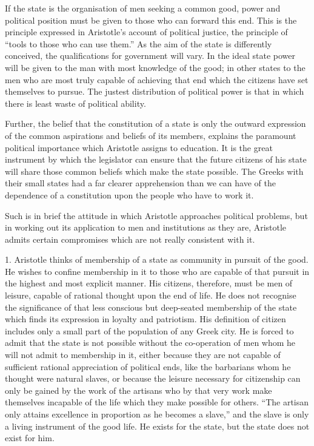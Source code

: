 If the state is the organisation of men seeking a common good, power and
political position must be given to those who can forward this end. This
is the principle expressed in Aristotle's account of political justice,
the principle of ``tools to those who can use them.'' As the aim of the
state is differently conceived, the qualifications for government will
vary. In the ideal state power will be given to the man with most
knowledge of the good; in other states to the men who are most truly
capable of achieving that end which the citizens have set themselves to
pursue. The justest distribution of political power is that in which there
is least waste of political ability.

Further, the belief that the constitution of a state is only the outward
expression of the common aspirations and beliefs of its members, explains
the paramount political importance which Aristotle assigns to education.
It is the great instrument by which the legislator can ensure that the
future citizens of his state will share those common beliefs which make
the state possible. The Greeks with their small states had a far clearer
apprehension than we can have of the dependence of a constitution upon the
people who have to work it.

Such is in brief the attitude in which Aristotle approaches political
problems, but in working out its application to men and institutions as
they are, Aristotle admits certain compromises which are not really
consistent with it.

1. Aristotle thinks of membership of a state as community in pursuit of
the good. He wishes to confine membership in it to those who are capable
of that pursuit in the highest and most explicit manner. His citizens,
therefore, must be men of leisure, capable of rational thought upon the
end of life. He does not recognise the significance of that less conscious
but deep-seated membership of the state which finds its expression in
loyalty and patriotism. His definition of citizen includes only a small
part of the population of any Greek city. He is forced to admit that the
state is not possible without the co-operation of men whom he will not
admit to membership in it, either because they are not capable of
sufficient rational appreciation of political ends, like the barbarians
whom he thought were natural slaves, or because the leisure necessary for
citizenship can only be gained by the work of the artisans who by that
very work make themselves incapable of the life which they make possible
for others. ``The artisan only attains excellence in proportion as he
becomes a slave,'' and the slave is only a living instrument of the good
life. He exists for the state, but the state does not exist for him.


